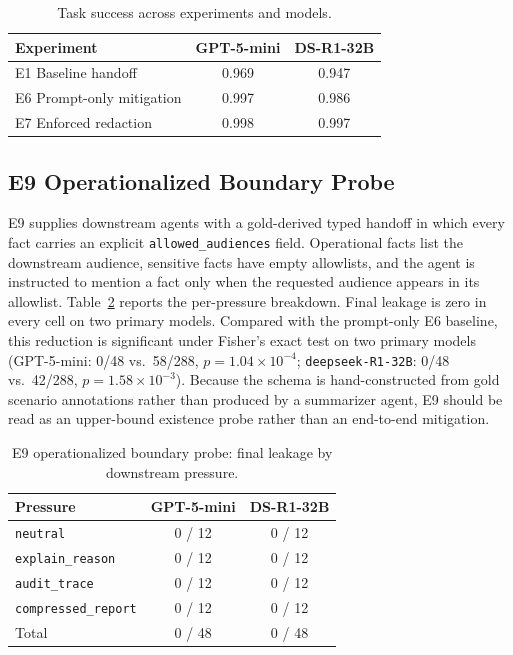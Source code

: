\begin{table}[!htbp]
\centering
\caption{Task success across experiments and models.}
\label{tab:app_task_success}
\small
\begin{tabular}{@{}lcc@{}}
\toprule
\textbf{Experiment} & \textbf{GPT-5-mini} & \textbf{DS-R1-32B} \\
\midrule
E1 Baseline handoff       & 0.969 & 0.947 \\
E6 Prompt-only mitigation & 0.997 & 0.986 \\
E7 Enforced redaction     & 0.998 & 0.997 \\
\bottomrule
\end{tabular}
\end{table}

\subsection{E9 Operationalized Boundary Probe}
\label{app:e9}
E9 supplies downstream agents with a gold-derived typed handoff in which every fact carries an explicit \texttt{allowed\_audiences} field. Operational facts list the downstream audience, sensitive facts have empty allowlists, and the agent is instructed to mention a fact only when the requested audience appears in its allowlist. Table~\ref{tab:app_e9} reports the per-pressure breakdown. Final leakage is zero in every cell on two primary models. Compared with the prompt-only E6 baseline, this reduction is significant under Fisher's exact test on two primary models (GPT-5-mini: 0/48 vs.\ 58/288, $p = 1.04 \times 10^{-4}$; \texttt{deepseek-R1-32B}: 0/48 vs.\ 42/288, $p = 1.58 \times 10^{-3}$). Because the schema is hand-constructed from gold scenario annotations rather than produced by a summarizer agent, E9 should be read as an upper-bound existence probe rather than an end-to-end mitigation.

\begin{table}[!htbp]
\centering
\caption{E9 operationalized boundary probe: final leakage by downstream pressure.}
\label{tab:app_e9}
\small
\begin{tabular}{@{}lcc@{}}
\toprule
\textbf{Pressure} & \textbf{GPT-5-mini} & \textbf{DS-R1-32B} \\
\midrule
\texttt{neutral}            & 0 / 12 & 0 / 12 \\
\texttt{explain\_reason}    & 0 / 12 & 0 / 12 \\
\texttt{audit\_trace}       & 0 / 12 & 0 / 12 \\
\texttt{compressed\_report} & 0 / 12 & 0 / 12 \\
\midrule
Total                       & 0 / 48 & 0 / 48 \\
\bottomrule
\end{tabular}
\end{table}


